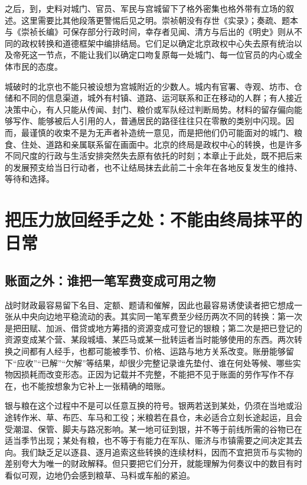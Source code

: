 之后，到，史料对城门、官员、军民与宫城留下了格外密集也格外带有立场的叙述。这里需要比其他段落更警惕后见之明。崇祯朝没有存世《实录》；奏疏、题本与《崇祯长编》可保存部分行政时间，幸存者见闻、清方与后出的《明史》则从不同的政权转换和道德框架中编排结局。它们足以确定北京政权中心失去原有统治以及帝死这一节点，不能让我们以确定口吻复原每一处城门、每一位官员的内心或全体市民的态度。

城破时的北京也不能只被设想为宫城附近的少数人。城内有官署、寺观、坊市、仓储和不同的信息渠道，城外有村镇、道路、运河联系和正在移动的人群；有人接近决策中心，有人只能从传闻、封门、粮价或军队经过判断局势。材料的留存偏向能够写作、能够被后人引用的人，普通居民的路径往往只在零散的类别中闪现。因而，最谨慎的收束不是为无声者补造统一意见，而是把他们仍可能面对的城门、粮食、住处、道路和亲属联系留在画面中。北京的终局是政权中心的转换，也是许多不同尺度的行政与生活安排突然失去原有依托的时刻；本章止于此处，既不把后来的发展预支给当日行动者，也不让结局抹去此前二十余年在各地反复发生的维持、等待和选择。

\section{把压力放回经手之处：不能由终局抹平的日常}

\subsection{账面之外：谁把一笔军费变成可用之物}

战时财政最容易留下名目、定额、题请和催解，因此也最容易诱使读者把它想成一张从中央向边地平稳流动的表。其实同一笔军费至少经历两次不同的转换：第一次是把田赋、加派、借贷或地方筹措的资源变成可登记的银粮；第二次是把已登记的资源变成某个营、某段城墙、某匹马或某一批转运者当时能够使用的东西。两次转换之间都有人经手，也都可能被季节、价格、运路与地方关系改变。账册能够留下“应收”“已解”“欠解”等结果，却很少完整记录谁先垫付、谁在何处等候、哪些实物因损耗而改变形态。正因为记载并不完整，不能把不见于账面的劳作写作不存在，也不能按想象为它补上一张精确的暗账。

银与粮在这个过程中不是可以任意互换的符号。银两若送到某处，仍须在当地或沿途转作米、草、布匹、车马和工役；米粮若在县仓，未必适合立刻长途起运，且会受潮湿、保管、脚夫与路况影响。某一地可征到银，并不等于前线所需的谷物已在适当季节出现；某处有粮，也不等于有能力在军队、赈济与市镇需要之间决定其去向。我们缺乏足以逐县、逐月追索这些转换的连续材料，因而不宜把货币与实物的差别夸大为唯一的财政解释。但只要把它们分开，就能理解为何奏议中的数目有时看似可观，边地仍会感到粮草、马料或车船的紧迫。

